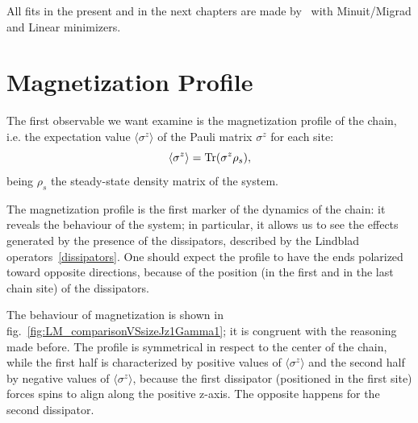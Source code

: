 All fits in the present and in the next chapters are made by~\cite{root_cern} with Minuit/Migrad and Linear minimizers.

\section{Magnetization Profile}
\label{sec:magn_profile}
The first observable we want examine is the magnetization profile of the chain, i.e. the expectation value $\langle \sigma^z \rangle$ of the Pauli matrix $\sigma^z$ for each site:
\begin{equation*}
    \langle \sigma^z \rangle = \operatorname{Tr}(\sigma^z \rho_s),
\end{equation*}
being $\rho_s$ the steady-state density matrix of the system.

The magnetization profile is the first marker of the dynamics of the chain: it reveals the behaviour of the system; in particular, it allows us to see the effects generated by the presence of the dissipators, described by the Lindblad operators~\ref{dissipators}. One should expect the profile to have the ends polarized toward opposite directions, because of the position (in the first and in the last chain site) of the dissipators.


The behaviour of magnetization is shown in fig.~\ref{fig:LM_comparisonVSsizeJz1Gamma1}; it is congruent with the reasoning made before. The profile is symmetrical in respect to the center of the chain, while the first half is characterized by positive values of  $\langle \sigma^z \rangle$ and the second half by negative values of $\langle \sigma^z \rangle$, because the first dissipator (positioned in the first site) forces spins to align along the positive z-axis. The opposite happens for the second dissipator.




